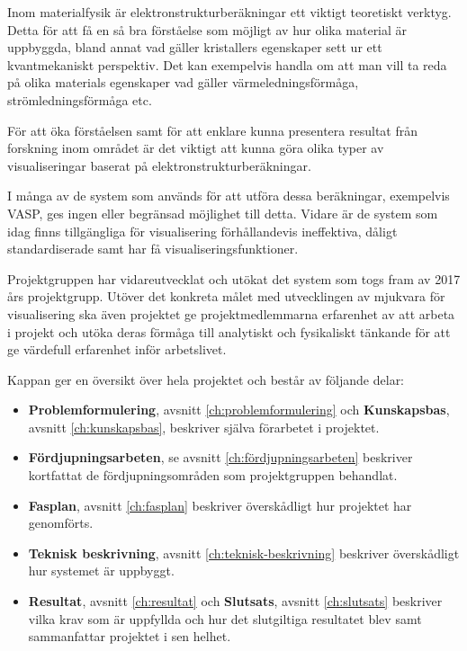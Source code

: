 \documentclass[a4paper,12pt]{article}
\begin{document}
Inom materialfysik är elektronstrukturberäkningar ett viktigt teoretiskt verktyg. Detta för att få en så bra förståelse som möjligt av hur olika material är uppbyggda, bland annat vad gäller kristallers egenskaper sett ur ett kvantmekaniskt perspektiv. Det kan exempelvis handla om att man vill ta reda på olika materials egenskaper vad gäller värmeledningsförmåga, strömledningsförmåga etc.

För att öka förståelsen samt för att enklare kunna presentera resultat från forskning inom området är det viktigt att kunna göra olika typer av visualiseringar baserat på elektronstrukturberäkningar.

I många av de system som används för att utföra dessa beräkningar, exempelvis VASP, ges ingen eller begränsad möjlighet till detta. Vidare är de system som idag finns tillgängliga för visualisering förhållandevis ineffektiva, dåligt standardiserade samt har få visualiseringsfunktioner.

Projektgruppen har vidareutvecklat och utökat det system som togs fram av 2017 års projektgrupp. Utöver det konkreta målet med utvecklingen av mjukvara för visualisering ska även projektet ge projektmedlemmarna erfarenhet av att arbeta i projekt och utöka deras förmåga till analytiskt och fysikaliskt tänkande för att ge värdefull erfarenhet inför arbetslivet.

Kappan ger en översikt över hela projektet och består av följande delar:

\begin{itemize}
	\item \textbf{Problemformulering}, avsnitt \ref{ch:problemformulering} och \textbf{Kunskapsbas}, avsnitt \ref{ch:kunskapsbas}, beskriver själva förarbetet i projektet.
	
	\item \textbf{Fördjupningsarbeten}, se avsnitt \ref{ch:fördjupningsarbeten} beskriver kortfattat de fördjupningsområden som projektgruppen behandlat.
	
	\item \textbf{Fasplan}, avsnitt \ref{ch:fasplan} beskriver överskådligt hur projektet har genomförts.

	\item \textbf{Teknisk beskrivning}, avsnitt \ref{ch:teknisk-beskrivning} beskriver överskådligt hur systemet är uppbyggt.
	
	\item \textbf{Resultat}, avsnitt \ref{ch:resultat} och \textbf{Slutsats}, avsnitt \ref{ch:slutsats} beskriver vilka krav som är uppfyllda och hur det slutgiltiga resultatet blev samt sammanfattar projektet i sen helhet.
\end{itemize}
\end{document}
